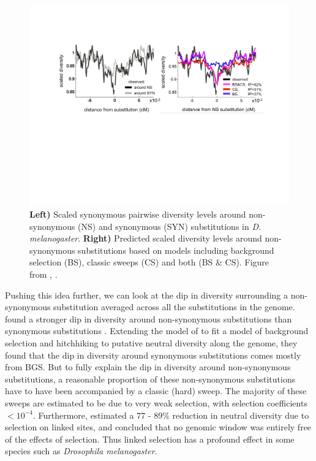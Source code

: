 \begin{figure}
\begin{center}
\includegraphics[width=\textwidth]{Journal_figs/recom_selection/Elyashiv_around_subs/Elyashiv_around_subs.pdf}
\end{center}
\caption{ {\bf Left) }  Scaled synonymous pairwise diversity levels around non-synonymous
  (NS) and synonymous (SYN) substitutions in {\it
    D. melanogaster}. {\bf Right)} Predicted scaled diversity levels
  around non-synonymous substitutions based on models including
  background selection (BS), classic sweeps (CS) and both (BS \&
  CS). Figure from \citet{elyashiv2016genomic}, \PLOSccBY.} \label{fig:Elyashiv_around_subs}
\end{figure}

Pushing this idea further, we can look at the dip in diversity
surrounding a non-synonymous substitution averaged across all the
substitutions in the genome. \citet{elyashiv2016genomic} found a
stronger dip in diversity around non-synonymous substitutions than
synonymous substitutions \citep[see also
][]{sattath2011pervasive}. Extending
the model of \citet{Mcvicker:09} to fit a model of background selection and
hitchhiking to putative neutral diversity along the genome, they found that
the dip in diversity around synonymous substitutions comes mostly from
BGS. But to fully explain the dip in diversity around non-synonymous
substitutions, a reasonable proportion of these non-synonymous
substitutions have to have been accompanied by a classic (hard)
sweep. The majority of these sweeps are estimated to be due to very
weak selection, with selection coefficients $<10^{-4}$. Furthermore, \citet{elyashiv2016genomic} estimated a
 $77$ - $89\%$ reduction in neutral diversity due to selection on linked sites, and concluded that no genomic window was entirely
free of the effects of selection. Thus linked selection has a profound
effect in some species such as {\it Drosophila melanogaster}. 



